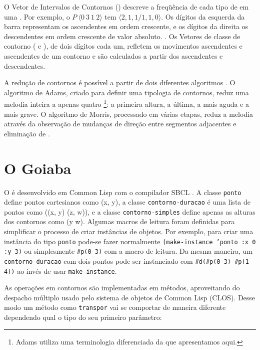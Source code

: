 O Vetor de Intervalos de Contornos () descreve a freqüência
de cada tipo de  em uma . Por exemplo, o
 $P\:\langle0\:3\:1\:2\rangle$ tem 
$\langle2,1,1/1,1,0\rangle$. Os dígitos da esquerda da barra
representam os  ascendentes em ordem crescente, e os dígitos
da direita os  descendentes em ordem crescente de valor
absoluto. \cite{friedmann85:methodology}. Os Vetores de classe de
contorno ( e ), de dois dígitos cada um,
refletem os movimentos ascendentes e ascendentes de um contorno e são
calculados a partir dos  ascendentes e descendentes.

A redução de contornos é possível a partir de dois diferentes
algoritmos \cite{adams76:melodic,morris93:directions}. O algoritmo de
Adams, criado para definir uma tipologia de contornos, reduz uma
melodia inteira a apenas quatro \footnote{Adams utiliza
  uma terminologia diferenciada da que apresentamos aqui.}: a primeira
altura, a última, a mais aguda e a mais grave. O algoritmo de Morris,
processado em várias etapas, reduz a melodia através da observação de
mudanças de direção entre segmentos adjacentes e eliminação de
.

\section{O Goiaba}
\label{sec:o-software}

O \goiaba{} é desenvolvido em Common Lisp com o compilador SBCL
\cite{team07:sbcl}. A classe \texttt{ponto} define pontos cartesianos
como (x, y), a classe \texttt{contorno-duracao} é uma lista de pontos
como ((x, y) (z, w)), e a classe \texttt{contorno-simples} define
apenas as alturas dos contornos como (y w). Algumas macros de leitura
foram definidas para simplificar o processo de criar instâncias de
objetos. Por exemplo, para criar uma instância do tipo \texttt{ponto}
pode-se fazer normalmente \texttt{(make-instance 'ponto :x 0 :y 3)} ou
simplesmente \verb!#p(0 3)! com a macro de leitura. Da mesma maneira,
um \texttt{contorno-duracao} com dois pontos pode ser instanciado com
\verb!#d(#p(0 3) #p(1 4))! ao invés de usar \texttt{make-instance}.

As operações em contornos são implementadas em métodos, aproveitando
do despacho múltiplo usado pelo sistema de objetos de Common Lisp
(CLOS). Desse modo um método como \texttt{transpor} vai se comportar
de maneira diferente dependendo qual o tipo do seu primeiro parâmetro:

